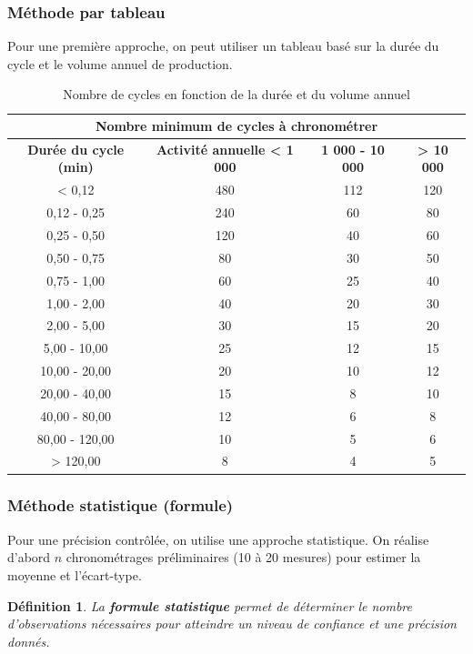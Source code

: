 \documentclass[a4paper,12pt]{article}
\newtheorem{definition}{Définition}[section]
\begin{document}
\subsubsection{Méthode par tableau}

Pour une première approche, on peut utiliser un tableau basé sur la durée du cycle et le volume annuel de production.

\begin{table}[ht]
\centering
\begin{tabular}{|c|c|c|c|}
\hline
\multicolumn{4}{|c|}{\textbf{Nombre minimum de cycles à chronométrer}} \\
\hline
\textbf{Durée du cycle (min)} & \textbf{Activité annuelle < 1 000} & \textbf{1 000 - 10 000} & \textbf{> 10 000} \\
\hline
< 0,12 & 480 & 112 & 120 \\
0,12 - 0,25 & 240 & 60 & 80 \\
0,25 - 0,50 & 120 & 40 & 60 \\
0,50 - 0,75 & 80 & 30 & 50 \\
0,75 - 1,00 & 60 & 25 & 40 \\
1,00 - 2,00 & 40 & 20 & 30 \\
2,00 - 5,00 & 30 & 15 & 20 \\
5,00 - 10,00 & 25 & 12 & 15 \\
10,00 - 20,00 & 20 & 10 & 12 \\
20,00 - 40,00 & 15 & 8 & 10 \\
40,00 - 80,00 & 12 & 6 & 8 \\
80,00 - 120,00 & 10 & 5 & 6 \\
> 120,00 & 8 & 4 & 5 \\
\hline
\end{tabular}
\caption{Nombre de cycles en fonction de la durée et du volume annuel}
\end{table}

\subsubsection{Méthode statistique (formule)}

Pour une précision contrôlée, on utilise une approche statistique. On réalise d'abord $n$ chronométrages préliminaires (10 à 20 mesures) pour estimer la moyenne et l'écart-type.

\begin{definition}
La \textbf{formule statistique} permet de déterminer le nombre d'observations nécessaires pour atteindre un niveau de confiance et une précision donnés.
\end{definition}
\end{document}
